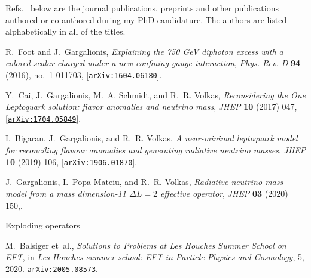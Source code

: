 \begin{publications}
 
  \begin{flushleft}
    Refs.~\cite{Foot:2016llc, Cai:2017wry, Bigaran:2019bqv, Gargalionis:2019drk,
      Balsiger:2020jls} below are the journal publications, preprints and other
    publications authored or co-authored during my PhD candidature. The authors
    are listed alphabetically in all of the titles.
  \end{flushleft}

  \journalpaperlist
  \begin{enumerate}[label={[\arabic*]}]
    \item R.~Foot and J.~Gargalionis, {\it {Explaining the 750 GeV diphoton
        excess with a colored scalar charged under a new confining gauge
        interaction}}, {\em Phys. Rev. D} {\bf 94} (2016), no.~1 011703,
    [\href{http://arxiv.org/abs/1604.06180}{{\tt arXiv:1604.06180}}].

    \item Y.~Cai, J.~Gargalionis, M.~A. Schmidt, and R.~R. Volkas, {\it
      {Reconsidering the One Leptoquark solution: flavor anomalies and neutrino
        mass}}, {\em JHEP} {\bf 10} (2017) 047,
    [\href{http://arxiv.org/abs/1704.05849}{{\tt arXiv:1704.05849}}].

    \item I.~Bigaran, J.~Gargalionis, and R.~R. Volkas, {\it {A near-minimal leptoquark
        model for reconciling flavour anomalies and generating radiative neutrino
        masses}},  {\em JHEP} {\bf 10} (2019) 106,
    [\href{http://arxiv.org/abs/1906.01870}{{\tt arXiv:1906.01870}}].

    \item J.~Gargalionis, I.~Popa-Mateiu, and R.~R. Volkas, {\it {Radiative
        neutrino mass model from a mass dimension-11 $\Delta L =2 $ effective
        operator}}, {\em JHEP} {\bf 03} (2020) 150,.

    \item Exploding operators

  \end{enumerate}

  \otherpaperlist
  \begin{enumerate}[label={[\arabic*]}]
    \setcounter{enumi}{5}

    \item M.~Balsiger et~al., {\it {Solutions to Problems at Les Houches Summer
        School on EFT}}, in {\em {Les Houches summer school}: {EFT in Particle
        Physics and Cosmology}}, 5, 2020. \newblock
    \href{http://arxiv.org/abs/2005.08573}{{\tt arXiv:2005.08573}}.

  \end{enumerate}

\end{publications}

